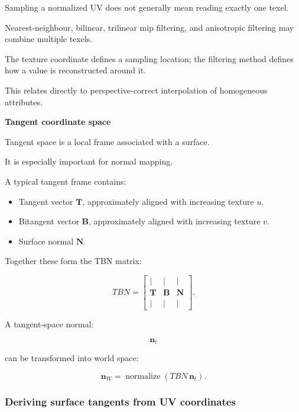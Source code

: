 \hypertarget{02-foundations-ii-ch032-texture-filtering}{}

Sampling a normalized UV does not generally mean reading exactly one texel.

Nearest-neighbour, bilinear, trilinear mip filtering, and anisotropic filtering may combine multiple texels.

The texture coordinate defines a sampling location; the filtering method defines how a value is reconstructed around it.

This relates directly to perspective-correct interpolation of homogeneous attributes.

\textbf{Tangent coordinate space}

Tangent space is a local frame associated with a surface.

It is especially important for normal mapping.

A typical tangent frame contains:

\begin{itemize}
\tightlist
\item
  Tangent vector \(\mathbf T\), approximately aligned with increasing texture \(u\).
\item
  Bitangent vector \(\mathbf B\), approximately aligned with increasing texture \(v\).
\item
  Surface normal \(\mathbf N\).
\end{itemize}

Together these form the TBN matrix:

\[
 \boxed{ TBN= \begin{bmatrix} |&|&|\\ \mathbf T&\mathbf B&\mathbf N\\ |&|&| \end{bmatrix} }.
\]

A tangent-space normal:

\[
 \mathbf n_t
\]

can be transformed into world space:

\[
 \boxed{ \mathbf n_W= \operatorname{normalize}(TBN\,\mathbf n_t) }.
\]

\subsubsection{Deriving surface tangents from UV coordinates}\label{02-foundations-ii-ch032-deriving-surface-tangents-from-uv-coordinates}

\hypertarget{02-foundations-ii-ch032-deriving-surface-tangents-from-uv-coordinates}{}

